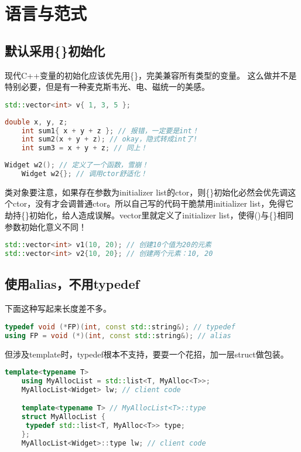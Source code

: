 \section{语言与范式}
\subsection{默认采用\{\}初始化}
现代C++变量的初始化应该优先用\{\}，完美兼容所有类型的变量。
这么做并不是特别必要，但是有一种麦克斯韦光、电、磁统一的美感。

\begin{lstlisting}[language=C++]
    std::vector<int> v{ 1, 3, 5 }; 
\end{lstlisting}

\begin{lstlisting}[language=C++]
    double x, y, z;
    int sum1{ x + y + z }; // 报错，一定要是int！
    int sum2(x + y + z); // okay，隐式转成int了!
    int sum3 = x + y + z; // 同上！
\end{lstlisting}

\begin{lstlisting}[language=C++]
    Widget w2(); // 定义了一个函数，雪崩！
    Widget w2{}; // 调用ctor舒适化！
\end{lstlisting}

类对象要注意，如果存在参数为initializer list的ctor，则\{\}初始化必然会优先调这个ctor，没有才会调普通ctor。所以自己写的代码干脆禁用initializer list，免得它劫持\{\}初始化，给人造成误解。vector里就定义了initializer list，使得()与\{\}相同参数初始化意义不同！

\begin{lstlisting}[language=C++]
std::vector<int> v1(10, 20); // 创建10个值为20的元素
std::vector<int> v2{10, 20}; // 创建两个元素：10, 20
\end{lstlisting}


\subsection{使用alias，不用typedef}

下面这种写起来长度差不多。
\begin{lstlisting}[language=C++]
typedef void (*FP)(int, const std::string&); // typedef
using FP = void (*)(int, const std::string&); // alias
\end{lstlisting}

但涉及template时，typedef根本不支持，要耍一个花招，加一层struct做包装。
\begin{lstlisting}[language=C++]
    template<typename T> 
    using MyAllocList = std::list<T, MyAlloc<T>>; 
    MyAllocList<Widget> lw; // client code

    template<typename T> // MyAllocList<T>::type
    struct MyAllocList { 
     typedef std::list<T, MyAlloc<T>> type; 
    }; 
    MyAllocList<Widget>::type lw; // client code
\end{lstlisting}
    


